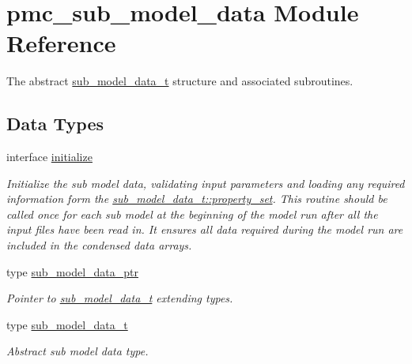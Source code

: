 \hypertarget{namespacepmc__sub__model__data}{}\section{pmc\+\_\+sub\+\_\+model\+\_\+data Module Reference}
\label{namespacepmc__sub__model__data}


The abstract \mbox{\hyperlink{structpmc__sub__model__data_1_1sub__model__data__t}{sub\+\_\+model\+\_\+data\+\_\+t}} structure and associated subroutines.  


\subsection*{Data Types}
\begin{DoxyCompactItemize}
\item 
interface \mbox{\hyperlink{interfacepmc__sub__model__data_1_1initialize}{initialize}}
\begin{DoxyCompactList}\small\item\em Initialize the sub model data, validating input parameters and loading any required information form the {\ttfamily \mbox{\hyperlink{structpmc__sub__model__data_1_1sub__model__data__t_aeb00155797966fc95e75ad14d45e7242}{sub\+\_\+model\+\_\+data\+\_\+t\+::property\+\_\+set}}}. This routine should be called once for each sub model at the beginning of the model run after all the input files have been read in. It ensures all data required during the model run are included in the condensed data arrays. \end{DoxyCompactList}\item 
type \mbox{\hyperlink{structpmc__sub__model__data_1_1sub__model__data__ptr}{sub\+\_\+model\+\_\+data\+\_\+ptr}}
\begin{DoxyCompactList}\small\item\em Pointer to \mbox{\hyperlink{structpmc__sub__model__data_1_1sub__model__data__t}{sub\+\_\+model\+\_\+data\+\_\+t}} extending types. \end{DoxyCompactList}\item 
type \mbox{\hyperlink{structpmc__sub__model__data_1_1sub__model__data__t}{sub\+\_\+model\+\_\+data\+\_\+t}}
\begin{DoxyCompactList}\small\item\em Abstract sub model data type. \end{DoxyCompactList}\end{DoxyCompactItemize}
